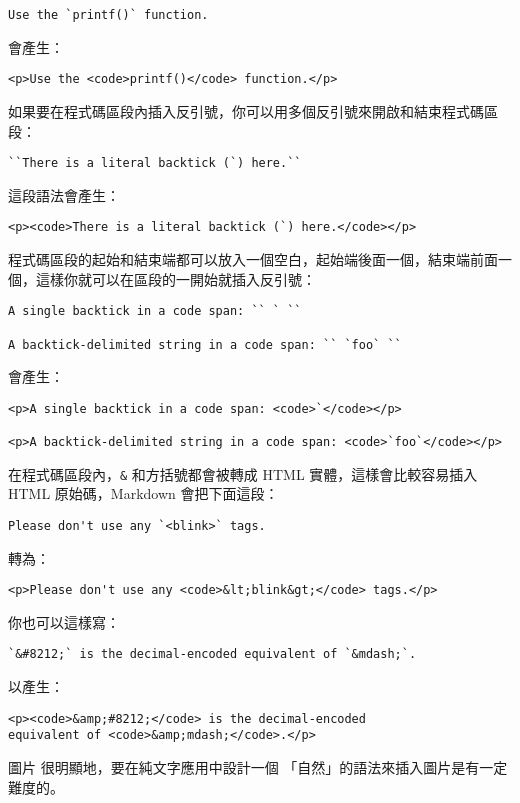 \begin{verbatim}
Use the `printf()` function.
\end{verbatim}
會產生：

\begin{verbatim}
<p>Use the <code>printf()</code> function.</p>
\end{verbatim}
如果要在程式碼區段內插入反引號，你可以用多個反引號來開啟和結束程式碼區段：

\begin{verbatim}
``There is a literal backtick (`) here.``
\end{verbatim}
這段語法會產生：

\begin{verbatim}
<p><code>There is a literal backtick (`) here.</code></p>
\end{verbatim}
程式碼區段的起始和結束端都可以放入一個空白，起始端後面一個，結束端前面一個，這樣你就可以在區段的一開始就插入反引號：

\begin{verbatim}
A single backtick in a code span: `` ` ``

A backtick-delimited string in a code span: `` `foo` ``
\end{verbatim}
會產生：

\begin{verbatim}
<p>A single backtick in a code span: <code>`</code></p>

<p>A backtick-delimited string in a code span: <code>`foo`</code></p>
\end{verbatim}
在程式碼區段內，\texttt{\&} 和方括號都會被轉成 HTML
實體，這樣會比較容易插入 HTML 原始碼，Markdown 會把下面這段：

\begin{verbatim}
Please don't use any `<blink>` tags.
\end{verbatim}
轉為：

\begin{verbatim}
<p>Please don't use any <code>&lt;blink&gt;</code> tags.</p>
\end{verbatim}
你也可以這樣寫：

\begin{verbatim}
`&#8212;` is the decimal-encoded equivalent of `&mdash;`.
\end{verbatim}
以產生：

\begin{verbatim}
<p><code>&amp;#8212;</code> is the decimal-encoded
equivalent of <code>&amp;mdash;</code>.</p>
\end{verbatim}
圖片
很明顯地，要在純文字應用中設計一個
「自然」的語法來插入圖片是有一定難度的。

